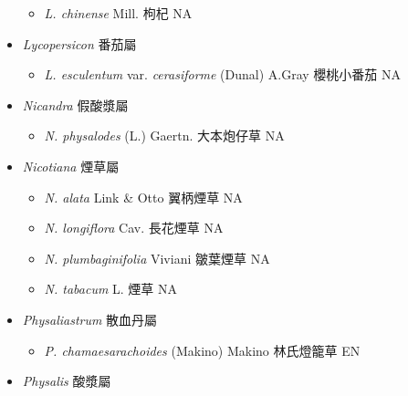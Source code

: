 \begin{itemize}
  \begin{itemize}
        \item[] \textit{L. chinense} Mill.  枸杞   NA
  \end{itemize}
 \item[] \textit{Lycopersicon} 番茄屬
                                
  \begin{itemize}
        \item[] \textit{L. esculentum} var. \textit{cerasiforme} (Dunal) A.Gray  櫻桃小番茄   NA
  \end{itemize}
 \item[] \textit{Nicandra} 假酸漿屬
                                
  \begin{itemize}
        \item[] \textit{N. physalodes} (L.) Gaertn.  大本炮仔草   NA
  \end{itemize}
 \item[] \textit{Nicotiana} 煙草屬
                                
  \begin{itemize}
        \item[] \textit{N. alata} Link \& Otto  翼柄煙草   NA
        \item[] \textit{N. longiflora} Cav.  長花煙草   NA
        \item[] \textit{N. plumbaginifolia} Viviani  皺葉煙草   NA
        \item[] \textit{N. tabacum} L.  煙草   NA
  \end{itemize}
 \item[] \textit{Physaliastrum} 散血丹屬
                                
  \begin{itemize}
        \item[] \textit{P. chamaesarachoides} (Makino) Makino  林氏燈籠草   EN
  \end{itemize}
 \item[] \textit{Physalis} 酸漿屬
                                

\end{itemize}
